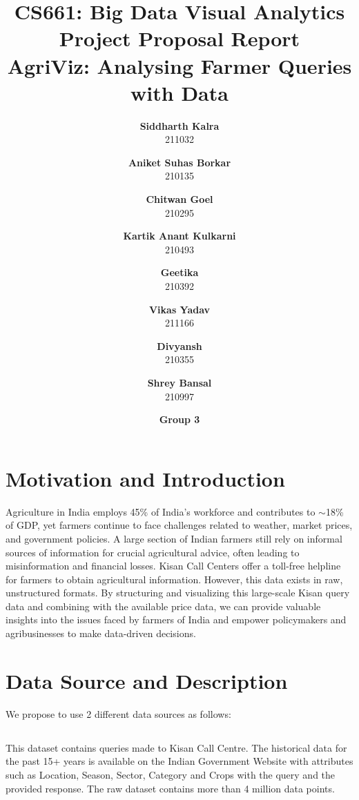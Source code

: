 \documentclass[11pt]{article}
\title{\Large{\bf CS661: Big Data Visual Analytics \\ Project Proposal Report} \\
\huge \bf AgriViz: Analysing Farmer Queries with Data}
\date{\textbf{Group 3}}
\author{\textbf{Siddharth Kalra}\\
211032
\and
\textbf{Aniket Suhas Borkar}\\
210135
\and
\textbf{Chitwan Goel}\\
210295
\and
\textbf{Kartik Anant Kulkarni}\\
210493
\and
\textbf{Geetika}\\
210392
\and
\textbf{Vikas Yadav}\\
211166
\and 
\textbf{Divyansh} \\
210355
\and
\textbf{Shrey Bansal} \\
210997
}
\begin{document}
\maketitle

\section{Motivation and Introduction}
Agriculture in India employs 45\% of India's workforce and contributes to $\sim$18\% of GDP, yet farmers continue to face challenges related to weather, market prices, and government policies. A large section of Indian farmers still rely on informal sources of information for crucial agricultural advice, often leading to misinformation and financial losses. Kisan Call Centers offer a toll-free helpline for farmers to obtain agricultural information. However, this data exists in raw, unstructured formats. By structuring and visualizing this large-scale Kisan query data and combining with the available price data, we can provide valuable insights into the issues faced by farmers of India and empower policymakers and agribusinesses to make data-driven decisions.

\section{Data Source and Description}

We propose to use 2 different data sources as follows:

\subsection*{}

This dataset contains queries made to Kisan Call Centre. The historical data for the past 15+ years is available on the Indian Government Website with attributes such as Location, Season, Sector, Category and Crops with the query and the provided response. The raw dataset contains more than 4 million data points.


\end{document}
